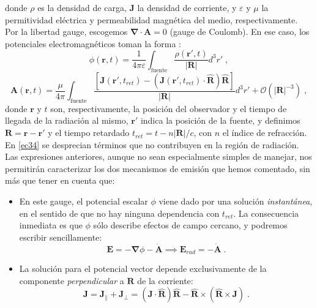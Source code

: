 \documentclass[11 pt, a4paper]{article} %
\numberwithin{equation}{section}
\numberwithin{figure}{section}
\numberwithin{table}{section}
\newcommand{\vect}[1]{\boldsymbol{\mathbf{#1}}}
\begin{document}
donde $\rho$ es la densidad de carga, $\vect{J}$ la densidad de corriente, y $\varepsilon$ y $\mu$ la permitividad eléctrica y permeabilidad magnética del medio, respectivamente. Por la libertad gauge, escogemos $\vect{\nabla}\cdot \vect{A}=0$ (gauge de Coulomb). En ese caso, los potenciales electromagnéticos toman la forma \cite{Jackson2002}:
\begin{equation}
	\phi(\vect{r}, t)=\frac{1}{4\pi\varepsilon}\int_{\text{fuente}} \frac{\rho(\vect{r}', t)}{\left|\vect{R}\right|}d^3r'\;,\label{ec33}
\end{equation}
\begin{equation}
	\vect{A}\left(\vect{r}, t\right)=\frac{\mu}{4\pi}\int_{\text{fuente}}\frac{\left[\vect{J}\left(\vect{r}', t_{ret}\right)-\left(\vect{J}\left(\vect{r}', t_{ret}\right)\cdot \hat{\vect{R}}\right)\hat{\vect{R}}\right]}{\left|\vect{R}\right|}d^3r'+\mathcal{O}(\left|\vect{R}\right|^{-3})\;,\label{ec34}
\end{equation}
donde $\vect{r}$ y $t$ son, respectivamente, la posición del observador y el tiempo de llegada de la radiación al mismo, $\vect{r}'$ indica la posición de la fuente, y definimos $\vect{R}=\vect{r}-\vect{r}'$ y el tiempo retardado $t_{ret}=t-n\left|\vect{R}\right|/c$, con $n$ el índice de refracción. En \eqref{ec34} se desprecian términos que no contribuyen en la región de radiación. Las expresiones anteriores, aunque no sean especialmente simples de manejar, nos permitirán caracterizar los dos mecanismos de emisión que hemos comentado, sin más que tener en cuenta que:
\begin{itemize}
	\item En este gauge, el potencial escalar $\phi$ viene dado por una solución \textit{instantánea}, en el sentido de que no hay ninguna dependencia con $t_{ret}$. La consecuencia inmediata es que $\phi$ sólo describe efectos de campo cercano, y podremos escribir sencillamente:
	\begin{equation}
		\vect{E}=-\vect{\nabla}\phi-\dot{\vect{A}}\implies \vect{E}_{rad} = -\dot{\vect{A}}\;.\label{ec35}
	\end{equation}
\item La solución para el potencial vector depende exclusivamente de la componente \textit{perpendicular} a $\vect{R}$ de la corriente:
\begin{equation}
	\vect{J}=\vect{J}_\parallel+\vect{J}_\perp = \left(\vect{J}\cdot\hat{\vect{R}}\right)\hat{\vect{R}}-\hat{\vect{R}}\times\left(\hat{\vect{R}}\times\vect{J}\right)\;.\label{ec36}
\end{equation} 
\end{itemize}
\end{document}
